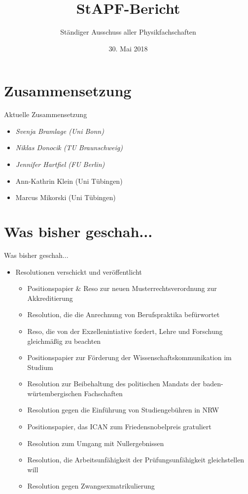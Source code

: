 \documentclass[compress, aspectratio=169]{beamer}
\title[StAPf-Bericht]{StAPF-Bericht}
\author{Ständiger Ausschuss aller Physikfachschaften}
\institute[Zusammenkunft aller Physikfachschaften]
\date{30. Mai 2018}
\begin{document}
\begin{frame}[plain]{}
  \titlepage
\end{frame}

\section{Zusammensetzung}

\begin{frame}{Aktuelle Zusammensetzung}
  \begin{itemize}
  \item \emph{Svenja Bramlage (Uni Bonn)}
  \item \emph{Niklas Donocik (TU Braunschweig)}
  \item \emph{Jennifer Hartfiel (FU Berlin)}
  \item Ann-Kathrin Klein (Uni Tübingen)
  \item Marcus Mikorski (Uni Tübingen)
  \end{itemize}
\end{frame}

\section{Was bisher geschah...}

\begin{frame}{Was bisher geschah...}
  \begin{itemize}
  \item Resolutionen verschickt und veröffentlicht
    \begin{itemize}
        \item Positionspapier \& Reso zur neuen Musterrechtsverordnung zur Akkreditierung
        \item Resolution, die die Anrechnung von Berufspraktika befürwortet
        \item Reso, die von der Exzellenintiative fordert, Lehre und Forschung gleichmäßig zu beachten
        \item Positionspapier zur Förderung der Wissenschaftskommunikation im Studium
        \item Resolution zur Beibehaltung des politischen Mandats der baden-würtembergischen Fachschaften
        \item Resolution gegen die Einführung von Studiengebühren in NRW
        \item Positionspapier, das ICAN zum Friedensnobelpreis gratuliert
        \item Resolution zum Umgang mit Nullergebnissen
        \item Resolution, die Arbeitsunfähigkeit der Prüfungsunfähigkeit gleichstellen will
        \item Resolution gegen Zwangsexmatrikulierung
    \end{itemize}
  \end{itemize}
\end{frame}
\end{document}
